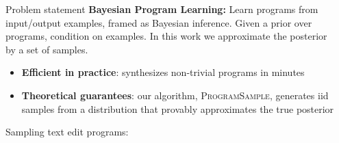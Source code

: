 \documentclass[final]{beamer}
\newlength{\sepwid}
\newlength{\onecolwid}
\newcommand{\theSystem}{\textsc{ProgramSample}}
\begin{document}
\begin{frame}[t] %

\begin{columns}[t] %

\begin{column}{\sepwid}\end{column} %

\begin{column}{\onecolwid} %



\begin{alertblock}{Problem statement}
  \textbf{Bayesian Program Learning:} Learn programs from input/output examples, framed as Bayesian inference.
  Given a prior over programs, condition on examples. 
  In this work we approximate the posterior by a set of samples.

  \begin{itemize}
  \item \textbf{Efficient in practice}: synthesizes non-trivial programs in minutes
  \item \textbf{Theoretical guarantees}: our algorithm, \theSystem , generates iid samples from a distribution that provably approximates the true posterior 
    \end{itemize}

Sampling text edit programs:
  
\centering{}
\end{alertblock}


\end{column}
\end{columns}
\end{frame}
\end{document}
